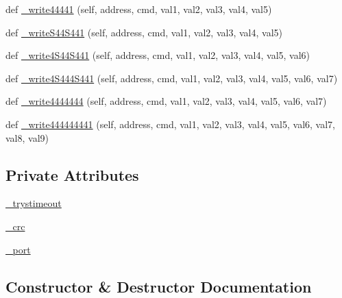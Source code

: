 \begin{DoxyCompactItemize}
\item 
def \mbox{\hyperlink{classtoxic__hardware_1_1roboclaw__3_1_1Roboclaw_ac6f91d4533d55b3faed87d62e3ec1321}{\+\_\+write44441}} (self, address, cmd, val1, val2, val3, val4, val5)
\item 
def \mbox{\hyperlink{classtoxic__hardware_1_1roboclaw__3_1_1Roboclaw_a223badc14ed6eedd81f59a68f1f1d21d}{\+\_\+write\+S44\+S441}} (self, address, cmd, val1, val2, val3, val4, val5)
\item 
def \mbox{\hyperlink{classtoxic__hardware_1_1roboclaw__3_1_1Roboclaw_a3c4820cb8ef2162259547e1dfd96ba09}{\+\_\+write4\+S44\+S441}} (self, address, cmd, val1, val2, val3, val4, val5, val6)
\item 
def \mbox{\hyperlink{classtoxic__hardware_1_1roboclaw__3_1_1Roboclaw_a77dcad54ad7bca7a423b39b09da13c8f}{\+\_\+write4\+S444\+S441}} (self, address, cmd, val1, val2, val3, val4, val5, val6, val7)
\item 
def \mbox{\hyperlink{classtoxic__hardware_1_1roboclaw__3_1_1Roboclaw_a8591ada3df39b3c4f7f4174457a6ced9}{\+\_\+write4444444}} (self, address, cmd, val1, val2, val3, val4, val5, val6, val7)
\item 
def \mbox{\hyperlink{classtoxic__hardware_1_1roboclaw__3_1_1Roboclaw_ace678d3b56bccfea26d0aceb3ba7125a}{\+\_\+write444444441}} (self, address, cmd, val1, val2, val3, val4, val5, val6, val7, val8, val9)
\end{DoxyCompactItemize}
\subsection*{Private Attributes}
\begin{DoxyCompactItemize}
\item 
\mbox{\hyperlink{classtoxic__hardware_1_1roboclaw__3_1_1Roboclaw_ad38ba788711533025f36a3c309e7cd05}{\+\_\+trystimeout}}
\item 
\mbox{\hyperlink{classtoxic__hardware_1_1roboclaw__3_1_1Roboclaw_a426d38f8c32b01dd95371848ec59a637}{\+\_\+crc}}
\item 
\mbox{\hyperlink{classtoxic__hardware_1_1roboclaw__3_1_1Roboclaw_a8a594e470266972798e6036301198819}{\+\_\+port}}
\end{DoxyCompactItemize}


\subsection{Constructor \& Destructor Documentation}
\mbox{\label{classtoxic__hardware_1_1roboclaw__3_1_1Roboclaw_ad5239ef3a4454827740060ab5c1e0c9c}} 
